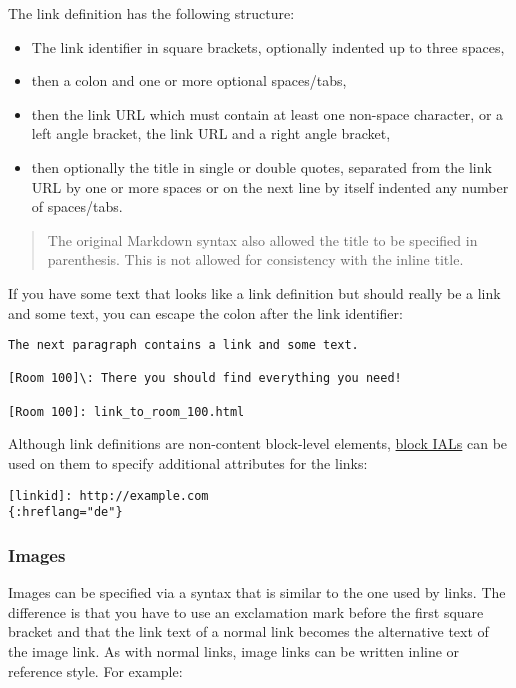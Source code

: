 \documentclass[a4paper]{article}
\begin{document}
The link definition has the following structure:

\begin{itemize}
\item
  The link identifier in square brackets, optionally indented up to
  three spaces,
\item
  then a colon and one or more optional spaces/tabs,
\item
  then the link URL which must contain at least one non-space character,
  or a left angle bracket, the link URL and a right angle bracket,
\item
  then optionally the title in single or double quotes, separated from
  the link URL by one or more spaces or on the next line by itself
  indented any number of spaces/tabs.
\end{itemize}

\begin{quote}
The original Markdown syntax also allowed the title to be specified in
parenthesis. This is not allowed for consistency with the inline title.
\end{quote}

If you have some text that looks like a link definition but should
really be a link and some text, you can escape the colon after the link
identifier:

\begin{verbatim}
The next paragraph contains a link and some text.

[Room 100]\: There you should find everything you need!

[Room 100]: link_to_room_100.html
\end{verbatim}

Although link definitions are non-content block-level elements,
\protect\hyperlink{block-ials}{block IALs} can be used on them to
specify additional attributes for the links:

\begin{verbatim}
[linkid]: http://example.com
{:hreflang="de"}
\end{verbatim}

\hypertarget{images}{\subsubsection{Images}\label{images}}

Images can be specified via a syntax that is similar to the one used by
links. The difference is that you have to use an exclamation mark before
the first square bracket and that the link text of a normal link becomes
the alternative text of the image link. As with normal links, image
links can be written inline or reference style. For example:
\end{document}
